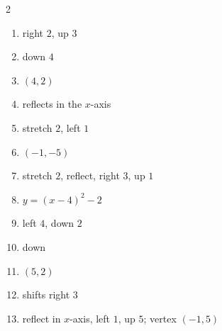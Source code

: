 \documentclass[11pt]{article}
\begin{document}
\begin{keybox}
\begin{multicols}{2}
\small
\begin{enumerate}[leftmargin=*,itemsep=3pt]
  \item right $2$, up $3$
  \item down $4$
  \item $(4,2)$
  \item reflects in the $x$-axis
  \item stretch $2$, left $1$
  \item $(-1,-5)$
  \item stretch $2$, reflect, right $3$, up $1$
  \item $y=(x-4)^2-2$
  \item left $4$, down $2$
  \item down
  \item $(5,2)$
  \item shifts right $3$
  \item reflect in $x$-axis, left $1$, up $5$; vertex $(-1,5)$
\end{enumerate}
\end{multicols}
\end{keybox}
\end{document}
